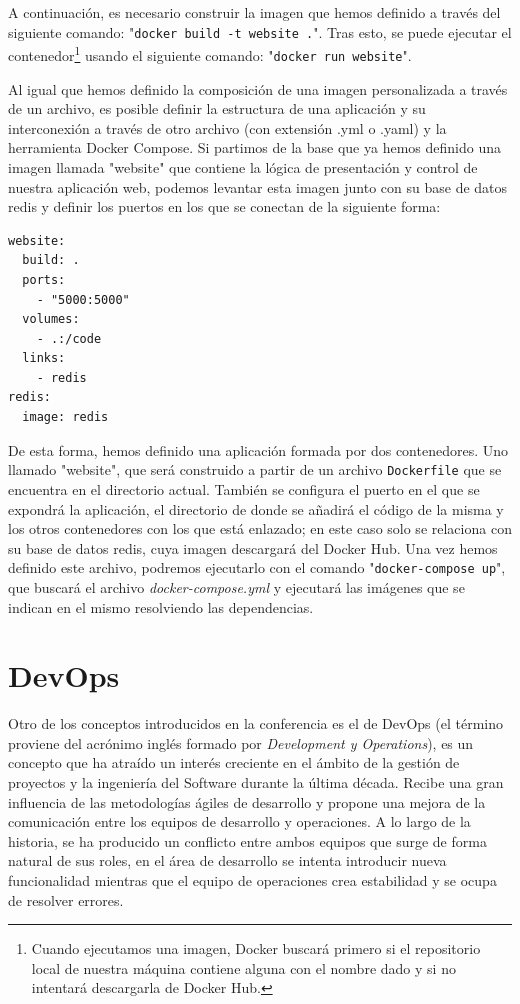A continuación, es necesario construir la imagen que hemos definido a través del siguiente comando: "\texttt{docker build -t website .}". Tras esto, se puede ejecutar el contenedor\footnote{Cuando ejecutamos una imagen, Docker buscará primero si el repositorio local de nuestra máquina contiene alguna con el nombre dado y si no intentará descargarla de Docker Hub.} usando el siguiente comando: "\texttt{docker run website}".

Al igual que hemos definido la composición de una imagen personalizada a través de un archivo, es posible definir la estructura de una aplicación y su interconexión a través de otro archivo (con extensión .yml o .yaml) y la herramienta Docker Compose. Si partimos de la base que ya hemos definido una imagen llamada "website" que contiene la lógica de presentación y control de nuestra aplicación web, podemos levantar esta imagen junto con su base de datos redis y definir los puertos en los que se conectan de la siguiente forma:

\begin{lstlisting}
website: 
  build: . 
  ports: 
    - "5000:5000" 
  volumes: 
    - .:/code 
  links: 
    - redis 
redis: 
  image: redis
\end{lstlisting}

De esta forma, hemos definido una aplicación formada por dos contenedores. Uno llamado "website", que será construido a partir de un archivo \texttt{Dockerfile} que se encuentra en el directorio actual. También se configura el puerto en el que se expondrá la aplicación, el directorio de donde se añadirá el código de la misma y los otros contenedores con los que está enlazado; en este caso solo se relaciona con su base de datos redis, cuya imagen descargará del Docker Hub. Una vez hemos definido este archivo, podremos ejecutarlo con el comando "\texttt{docker-compose up}", que buscará el archivo \emph{docker-compose.yml} y ejecutará las imágenes que se indican en el mismo resolviendo las dependencias.

\section{DevOps}\label{sec:devops}

Otro de los conceptos introducidos en la conferencia es el de DevOps (el término proviene del acrónimo inglés formado por \textit{Development y Operations}), es un concepto que ha atraído un interés creciente en el ámbito de la gestión de proyectos y la ingeniería del Software durante la última década. Recibe una gran influencia de las metodologías ágiles de desarrollo y propone una mejora de la comunicación entre los equipos de desarrollo y operaciones. A lo largo de la historia, se ha producido un conflicto entre ambos equipos que surge de forma natural de sus roles, en el área de desarrollo se intenta introducir nueva funcionalidad mientras que el equipo de operaciones crea estabilidad y se ocupa de resolver errores. 

